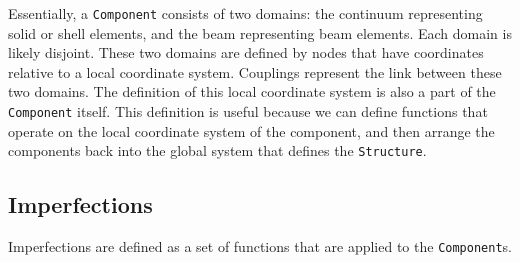 \documentclass[a4paper]{article}
\newcommand{\structureClass}{\texttt{Structure}}
\newcommand{\componentClass}{\texttt{Component}}
\begin{document}
Essentially, a \componentClass{} consists of two domains: the continuum representing solid or shell elements, and the beam representing beam elements.
Each domain is likely disjoint.
These two domains are defined by nodes that have coordinates relative to a local coordinate system.
Couplings represent the link between these two domains.
The definition of this local coordinate system is also a part of the \componentClass{} itself.
This definition is useful because we can define functions that operate on the local coordinate system of the component, and then arrange the components back into the global system that defines the \structureClass{}.

\subsection{Imperfections}

Imperfections are defined as a set of functions that are applied to the \componentClass{}s.
\end{document}
